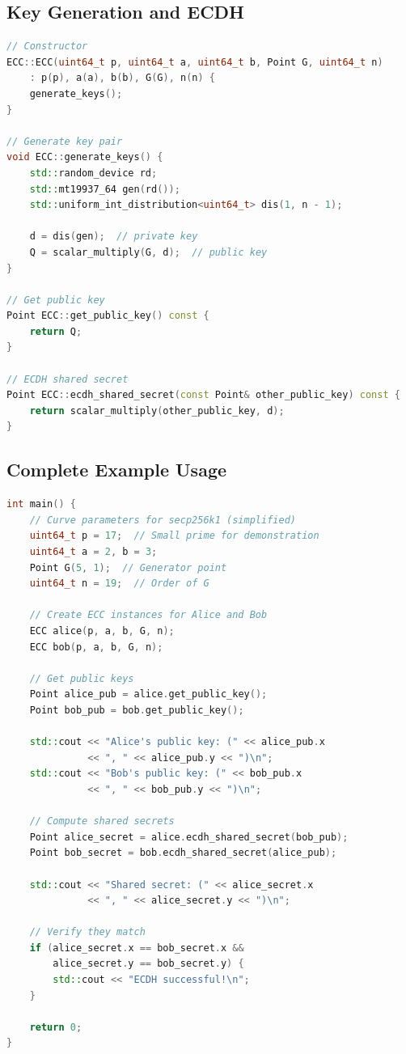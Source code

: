 \documentclass[11pt,a4paper]{article}
\begin{document}
\subsection{Key Generation and ECDH}

\begin{lstlisting}[language=C++, caption=Key Generation and ECDH]
// Constructor
ECC::ECC(uint64_t p, uint64_t a, uint64_t b, Point G, uint64_t n) 
    : p(p), a(a), b(b), G(G), n(n) {
    generate_keys();
}

// Generate key pair
void ECC::generate_keys() {
    std::random_device rd;
    std::mt19937_64 gen(rd());
    std::uniform_int_distribution<uint64_t> dis(1, n - 1);
    
    d = dis(gen);  // private key
    Q = scalar_multiply(G, d);  // public key
}

// Get public key
Point ECC::get_public_key() const {
    return Q;
}

// ECDH shared secret
Point ECC::ecdh_shared_secret(const Point& other_public_key) const {
    return scalar_multiply(other_public_key, d);
}
\end{lstlisting}

\subsection{Complete Example Usage}

\begin{lstlisting}[language=C++, caption=Complete ECC Example]
int main() {
    // Curve parameters for secp256k1 (simplified)
    uint64_t p = 17;  // Small prime for demonstration
    uint64_t a = 2, b = 3;
    Point G(5, 1);  // Generator point
    uint64_t n = 19;  // Order of G
    
    // Create ECC instances for Alice and Bob
    ECC alice(p, a, b, G, n);
    ECC bob(p, a, b, G, n);
    
    // Get public keys
    Point alice_pub = alice.get_public_key();
    Point bob_pub = bob.get_public_key();
    
    std::cout << "Alice's public key: (" << alice_pub.x 
              << ", " << alice_pub.y << ")\n";
    std::cout << "Bob's public key: (" << bob_pub.x 
              << ", " << bob_pub.y << ")\n";
    
    // Compute shared secrets
    Point alice_secret = alice.ecdh_shared_secret(bob_pub);
    Point bob_secret = bob.ecdh_shared_secret(alice_pub);
    
    std::cout << "Shared secret: (" << alice_secret.x 
              << ", " << alice_secret.y << ")\n";
    
    // Verify they match
    if (alice_secret.x == bob_secret.x && 
        alice_secret.y == bob_secret.y) {
        std::cout << "ECDH successful!\n";
    }
    
    return 0;
}
\end{lstlisting}
\end{document}
